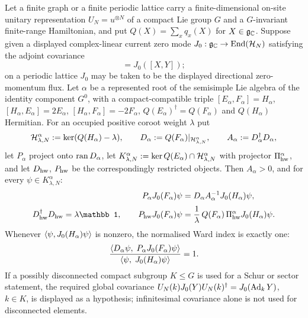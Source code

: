 \begin{theorem}
\label{thm:soft-index-compact-G}
\statusProved

Let a finite graph or a finite periodic lattice carry a finite-dimensional
on-site unitary representation $U_N=u^{\otimes N}$ of a compact Lie group $G$
and a $G$-invariant finite-range Hamiltonian, and put
$Q(X)=\sum_x q_x(X)$ for $X\in\mathfrak g_{\mathbb{C}}$. Suppose given a displayed
complex-linear current zero mode
$J_0:\mathfrak g_{\mathbb{C}}\to\mathrm{End}(\mathcal{H}_N)$ satisfying the adjoint covariance
\begin{equation}
  [Q(X),J_0(Y)]=J_0([X,Y]);
  \label{eq:adjoint-covariance}
\end{equation}
on a periodic lattice $J_0$ may be taken to be the displayed directional
zero-momentum flux. Let $\alpha$ be a represented root of the semisimple Lie
algebra of the identity component $G^0$, with a compact-compatible triple
$[E_\alpha,F_\alpha]=H_\alpha$, $[H_\alpha,E_\alpha]=2E_\alpha$,
$[H_\alpha,F_\alpha]=-2F_\alpha$, $Q(E_\alpha)^\dagger=Q(F_\alpha)$ and
$Q(H_\alpha)$ Hermitian. For an occupied positive coroot weight $\lambda$ put
\[
  \mathcal{H}^\alpha_{\lambda,N}:=\ker(Q(H_\alpha)-\lambda),\qquad
  D_\alpha:=Q(F_\alpha)|_{\mathcal{H}^\alpha_{\lambda,N}},\qquad
  A_\alpha:=D_\alpha^\dagger D_\alpha,
\]
let $P_\alpha$ project onto $\operatorname{ran} D_\alpha$, let
$K^\alpha_{\lambda,N}:=\ker Q(E_\alpha)\cap\mathcal{H}^\alpha_{\lambda,N}$ with
projector $\Pi^\alpha_{\rm hw}$, and let $D_{\rm hw}$, $P_{\rm hw}$ be the
correspondingly restricted objects. Then $A_\alpha>0$, and for every
$\psi\in K^\alpha_{\lambda,N}$:
\begin{align}
  P_\alpha J_0(F_\alpha)\psi
    &=D_\alpha A_\alpha^{-1}J_0(H_\alpha)\psi,
    \label{eq:hg-full}\\[2pt]
  D_{\rm hw}^\dagger D_{\rm hw}=\lambda\mathbb 1,
  \qquad
  P_{\rm hw}J_0(F_\alpha)\psi
    &=\frac{1}{\lambda}\,Q(F_\alpha)\,\Pi^\alpha_{\rm hw}J_0(H_\alpha)\psi.
    \label{eq:hg-restricted}
\end{align}
Whenever $\langle \psi,J_0(H_\alpha)\psi\rangle$ is nonzero, the normalised Ward
index is exactly one:
\begin{equation}
  \frac{\langle D_\alpha\psi,\;P_\alpha J_0(F_\alpha)\psi\rangle}
       {\langle \psi,\;J_0(H_\alpha)\psi\rangle}=1.
  \label{eq:hg-index}
\end{equation}
If a possibly disconnected compact subgroup $K\le G$ is used for a Schur or
sector statement, the required global covariance
$U_N(k)J_0(Y)U_N(k)^\dagger=J_0(\operatorname{Ad}_kY)$, $k\in K$, is displayed as a
hypothesis; infinitesimal covariance alone is not used for disconnected
elements.
\end{theorem}


